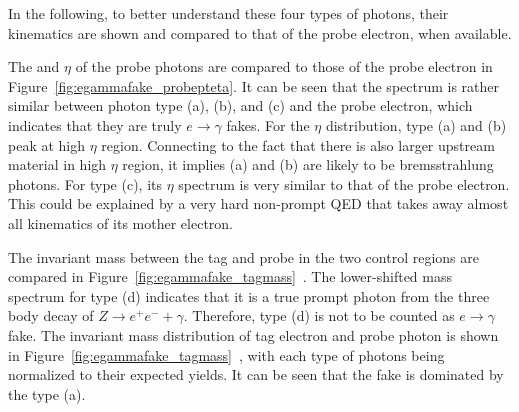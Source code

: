In the following, to better understand these four types of photons, their kinematics are shown and compared to that of the probe electron, when available.

The \pt and $\eta$ of the probe photons are compared to those of the probe electron in Figure~\ref{fig:egammafake_probepteta}. 
It can be seen that the \pt spectrum is rather similar between photon type (a), (b), and (c) and the probe electron, which indicates that they are truly $e\to\gamma$ fakes.
For the $\eta$ distribution, type (a) and (b) peak at high $\eta$ region. Connecting to the fact that there is also larger upstream material in high $\eta$ region, it implies (a) and (b) are likely to be bremsstrahlung photons.
For type (c), its $\eta$ spectrum is very similar to that of the probe electron. This could be explained by a very hard non-prompt QED that takes away almost all kinematics of its mother electron.

The invariant mass between the tag and probe in the two control regions are compared in Figure~\ref{fig:egammafake_tagmass}~. The lower-shifted mass spectrum for type (d) indicates that it is a true prompt photon from the three body decay of $Z\to e^+e^- +\gamma$. Therefore, type (d) is not to be counted as $e\rightarrow \gamma$ fake. The invariant mass distribution of tag electron and probe photon is shown in Figure~\ref{fig:egammafake_tagmass}~, with each type of photons being normalized to their expected yields. It can be seen that the fake is dominated by the type (a).


